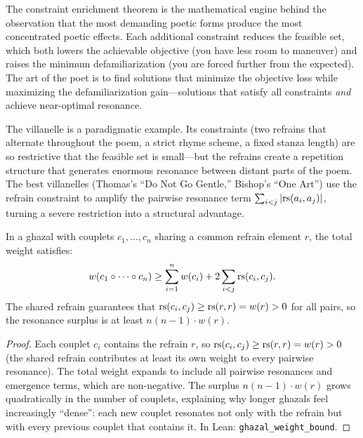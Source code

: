 \begin{remark}
The constraint enrichment theorem is the mathematical engine behind the
observation that the most demanding poetic forms produce the most concentrated
poetic effects.  Each additional constraint reduces the feasible set, which
both lowers the achievable objective (you have less room to maneuver) and
raises the minimum defamiliarization (you are forced further from the
expected).  The art of the poet is to find solutions that minimize the
objective loss while maximizing the defamiliarization gain---solutions that
satisfy all constraints \emph{and} achieve near-optimal resonance.

The villanelle is a paradigmatic example.  Its constraints (two refrains that
alternate throughout the poem, a strict rhyme scheme, a fixed stanza length)
are so restrictive that the feasible set is small---but the refrains create
a repetition structure that generates enormous resonance between distant parts
of the poem.  The best villanelles (Thomas's ``Do Not Go Gentle,'' Bishop's
``One Art'') use the refrain constraint to amplify the pairwise resonance term
$\sum_{i < j} |\mathrm{rs}(a_i, a_j)|$, turning a severe restriction into a
structural advantage.
\end{remark}


\begin{theorem}
\label{thm:ghazal-weight}
In a ghazal with couplets $c_1, \ldots, c_n$ sharing a common refrain element $r$, the total weight satisfies:
\[
  w(c_1 \circ \cdots \circ c_n) \geq \sum_{i=1}^{n} w(c_i) + 2\sum_{i < j} \mathrm{rs}(c_i, c_j).
\]
The shared refrain guarantees that $\mathrm{rs}(c_i, c_j) \geq \mathrm{rs}(r, r) = w(r) > 0$ for all pairs, so the resonance surplus is at least $n(n-1) \cdot w(r)$.
\end{theorem}

\begin{proof}
Each couplet $c_i$ contains the refrain $r$, so $\mathrm{rs}(c_i, c_j) \geq \mathrm{rs}(r, r) = w(r) > 0$ (the shared refrain contributes at least its own weight to every pairwise resonance).  The total weight expands to include all pairwise resonances and emergence terms, which are non-negative.  The surplus $n(n-1) \cdot w(r)$ grows quadratically in the number of couplets, explaining why longer ghazals feel increasingly ``dense'': each new couplet resonates not only with the refrain but with every previous couplet that contains it.  In Lean: \texttt{ghazal\_weight\_bound}.
\end{proof}

